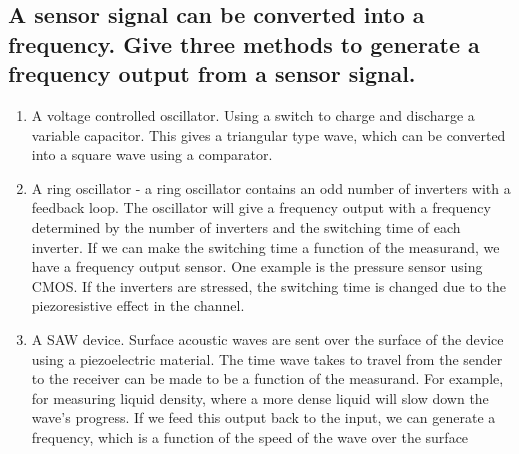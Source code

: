 \documentclass[10pt,a4paper]{article}
\begin{document}
\subsection{A sensor signal can be converted into a frequency. Give three methods to generate a frequency output from a
sensor signal.}

\begin{enumerate}

	\item A voltage controlled oscillator. Using a switch to charge and discharge a variable capacitor. This gives a triangular type wave, which can be converted into a square wave using a comparator.
	\item A ring oscillator - a ring oscillator contains an odd number of inverters with a feedback loop. The oscillator will give a frequency output with a frequency determined by the number of inverters and the switching time of each inverter. If we can make the switching time a function of the measurand, we have a frequency output sensor. One example is the pressure sensor using CMOS. If the inverters are stressed, the switching time is changed due to the piezoresistive effect in the channel.
	\item A SAW device. Surface acoustic waves are sent over the surface of the device using a piezoelectric material. The time wave takes to travel from the sender to the receiver can be made to be a function of the measurand. For example, for measuring liquid density, where a more dense liquid will slow down the wave's progress. If we feed this output back to the input, we can generate a frequency, which is a function of the speed of the wave over the surface
\end{enumerate}
\end{document}
